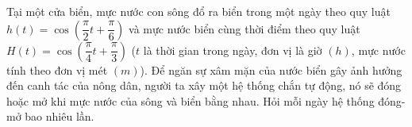 \begin{bt}%
	Tại một cửa biển, mực nước con sông đổ ra biển trong một ngày theo quy luật $h(t)=\cos \left(\dfrac{\pi}{2} t+\dfrac{\pi}{6}\right)$ và mực nước biển cùng thời điểm theo quy luật $H(t)=\cos \left(\dfrac{\pi}{4} t+\dfrac{\pi}{3}\right)$ ($t$ là thời gian trong ngày, đơn vị là giờ $(h)$, mực nước tính theo đơn vị mét $(m)$). Để ngăn sự xâm mặn của nước biển gây ảnh hưởng đến canh tác của nông dân, người ta xây một hệ thống chắn tự động, nó sẽ đóng hoặc mở khi mực nước của sông và biển bằng nhau. Hỏi mỗi ngày hệ thống đóng-mở bao nhiêu lần.
\end{bt}
